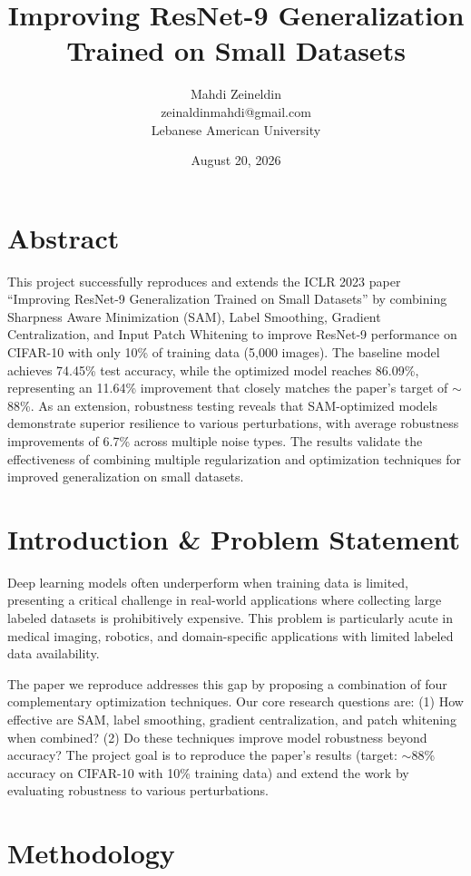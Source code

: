 \documentclass[11pt,a4paper]{article}
\title{\Large \textbf{Improving ResNet-9 Generalization Trained on Small Datasets}}
\author{Mahdi Zeineldin \\ zeinaldinmahdi@gmail.com \\ Lebanese American University}
\date{August 20, 2026}
\begin{document}
\maketitle

\section*{Abstract}

This project successfully reproduces and extends the ICLR 2023 paper ``Improving ResNet-9 Generalization Trained on Small Datasets'' by combining Sharpness Aware Minimization (SAM), Label Smoothing, Gradient Centralization, and Input Patch Whitening to improve ResNet-9 performance on CIFAR-10 with only 10\% of training data (5,000 images). The baseline model achieves 74.45\% test accuracy, while the optimized model reaches 86.09\%, representing an 11.64\% improvement that closely matches the paper's target of $\sim$88\%. As an extension, robustness testing reveals that SAM-optimized models demonstrate superior resilience to various perturbations, with average robustness improvements of 6.7\% across multiple noise types. The results validate the effectiveness of combining multiple regularization and optimization techniques for improved generalization on small datasets.

\section{Introduction \& Problem Statement}

Deep learning models often underperform when training data is limited, presenting a critical challenge in real-world applications where collecting large labeled datasets is prohibitively expensive. This problem is particularly acute in medical imaging, robotics, and domain-specific applications with limited labeled data availability.

The paper we reproduce addresses this gap by proposing a combination of four complementary optimization techniques. Our core research questions are: (1) How effective are SAM, label smoothing, gradient centralization, and patch whitening when combined? (2) Do these techniques improve model robustness beyond accuracy? The project goal is to reproduce the paper's results (target: $\sim$88\% accuracy on CIFAR-10 with 10\% training data) and extend the work by evaluating robustness to various perturbations.

\section{Methodology}
\end{document}
